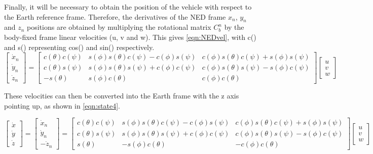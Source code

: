 Finally, it will be necessary to obtain the position of the vehicle with respect to the Earth reference frame. Therefore, the derivatives of the NED frame $x_{n}$, $y_{n}$ and $z_{n}$ positions are obtained by multiplying the rotational matrix $C^{n}_{b}$ by the body-fixed frame linear velocities (u, v and w). This gives \eqref{eqn:NEDvel}, with c() and s() representing cos() and sin() respectively. 
\begin{equation}\label{eqn:NEDvel}
\begin{bmatrix}
\dot{x}_{n}\\\dot{y}_{n}\\\dot{z}_{n}
\end{bmatrix}
=
\begin{bmatrix}
c(\theta)c(\psi) & s(\phi)s(\theta)c(\psi)-c(\phi)s(\psi) & c(\phi)s(\theta)c(\psi)+s(\phi)s(\psi)\\
c(\theta)s(\psi) & s(\phi)s(\theta)s(\psi)+c(\phi)c(\psi) & c(\phi)s(\theta)s(\psi)-s(\phi)c(\psi)\\
-s(\theta) & s(\phi)c(\theta) & c(\phi)c(\theta)
\end{bmatrix}
\begin{bmatrix}
u\\v\\w
\end{bmatrix}
\end{equation}

These velocities can then be converted into the Earth frame with the z axis pointing up, as shown in \eqref{eqn:state4}.
\begin{small}
\begin{equation}\label{eqn:state4}
\begin{bmatrix}
\dot{x}\\\dot{y}\\\dot{z}
\end{bmatrix}
=
\begin{bmatrix}
\dot{x}_{n}\\\dot{y}_{n}\\-\dot{z}_{n}
\end{bmatrix}
=
\begin{bmatrix}
c(\theta)c(\psi) & s(\phi)s(\theta)c(\psi)-c(\phi)s(\psi) & c(\phi)s(\theta)c(\psi)+s(\phi)s(\psi)\\
c(\theta)s(\psi) & s(\phi)s(\theta)s(\psi)+c(\phi)c(\psi) & c(\phi)s(\theta)s(\psi)-s(\phi)c(\psi)\\
s(\theta) & -s(\phi)c(\theta) & -c(\phi)c(\theta)
\end{bmatrix}
\begin{bmatrix}
u\\v\\w
\end{bmatrix}
\end{equation}
\end{small}


